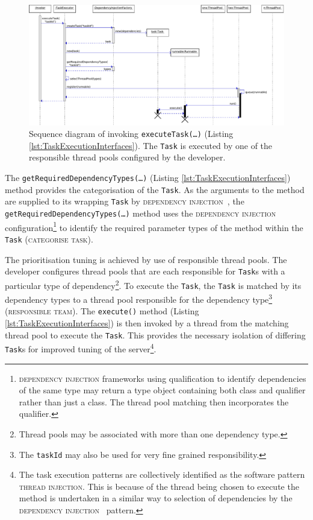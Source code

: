 \documentclass[prodmode]{style/acmlarge}
\begin{document}
\begin{figure}[!t]
\centering
\includegraphics[width=6in]{ExecuteComponentSequenceDiagram}
\caption{Sequence diagram of invoking \texttt{executeTask(\ldots)} (Listing \ref{lst:TaskExecutionInterfaces}).  The \texttt{Task} is executed by one of the responsible thread pools configured by the developer.}
\label{fig:ExecuteComponentSequenceDiagram}
\end{figure}

The \texttt{getRequiredDependencyTypes(\ldots)} (Listing
\ref{lst:TaskExecutionInterfaces}) method provides the categorisation of the
\texttt{Task}.  As the arguments to the method are supplied to its wrapping
\texttt{Task} by \textsc{dependency injection}~\cite{ioc}, the
\texttt{getRequiredDependencyTypes(\ldots)} method uses the
\textsc{dependency injection} configuration\footnote{\textsc{dependency injection}
frameworks using qualification to identify dependencies of the same type may
return a type object containing both class and qualifier rather than just a
class.  The thread pool matching then incorporates the qualifier.} to identify
the required parameter types of the method within the \texttt{Task}
(\textsc{categorise task}).

The prioritisation tuning is achieved by use of responsible thread pools.  The
developer configures thread pools that are each responsible for \texttt{Task}s
with a particular type of dependency\footnote{Thread pools may be associated
with more than one dependency type.}.  To execute the \texttt{Task}, the
\texttt{Task} is matched by its dependency types to a thread pool responsible
for the dependency type\footnote{The \texttt{taskId} may also be used for very
fine grained responsibility.} (\textsc{responsible team}).  The
\texttt{execute()} method (Listing \ref{lst:TaskExecutionInterfaces}) is then
invoked by a thread from the matching thread pool to execute the \texttt{Task}. 
This provides the necessary isolation of differing \texttt{Task}s for improved
tuning of the server\footnote{The task execution patterns are collectively
identified as the software pattern \textsc{thread injection}.  This is because
of the thread being chosen to execute the method is undertaken in a similar way
to selection of dependencies by the \textsc{dependency injection}~\cite{ioc}
pattern.}.
\end{document}
